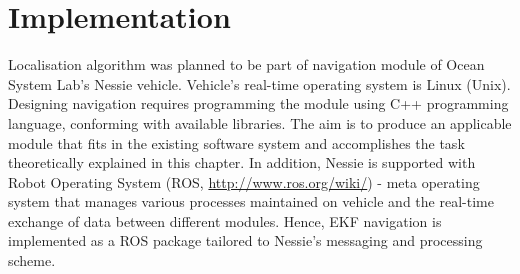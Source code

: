 \section{Implementation} \label{sec:implementation}
Localisation algorithm was planned to be part of navigation module of Ocean System Lab's Nessie vehicle. Vehicle's real-time operating system is Linux (Unix). Designing navigation requires programming the module using C++ programming language, conforming with available libraries. The aim is to produce an applicable module that fits in the existing software system and accomplishes the task theoretically explained in this chapter. In addition, Nessie is supported with Robot Operating System (ROS, \url{http://www.ros.org/wiki/}) - meta operating system that manages various processes maintained on vehicle and the real-time exchange of data between different modules. Hence, EKF navigation is implemented as a ROS package tailored to Nessie's messaging and processing scheme. 

